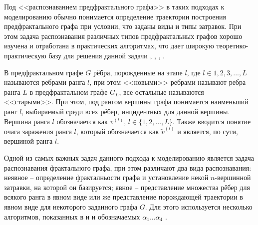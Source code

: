 Под <<распознаванием предфрактального графа>> в таких подходах к моделированию  обычно понимается  определение траектории построения предфрактального графа при условии, что заданы виды и типы затравок. При этом задача распознавания различных типов предфрактальных графов хорошо изучена и отработана в практических алгоритмах, что дает широкую теоретико-практическую базу для решения данной задачи %
\cite{Reznikov:2010},
\cite{Naimanova:2007},
\cite{Utukaeva:2008},
\cite{Utukaeva:2011}
.

В предфрактальном графе $G$ рёбра, порожденные на этапе $l$, где $l \in {1,2,3, ..., L}$ называются ребрами ранга $l$, при этом <<новыми>> ребрами называют ребра ранга $L$ в предфрактальном графе $G_L$, все остальные называются <<старыми>>.  При этом, под рангом вершины графа понимается наименьший ранг $l$, выбираемый среди всех рёбер, инцидентных для данной вершины. Вершина ранга $l$ обозначается как $v^{(l)}$, $l \in \{1,2,..., L\}$. Также вводится понятие очага заражения ранга $l$, который обозначается как $\tilde{v}^{(l)}$ и является, по сути, вершиной ранга $l$. 

Одной из самых важных задач данного подхода к моделированию является задача распознавания фрактального графа, при этом различают два вида распознавания: неявное -- определение фракталньости графа и установление некой $n$-вершинной затравки, на которой он базируется; явное -- представление множества рёбер для всякого ранга в явном виде или же представление порождающей траектории в явном виде для некоторого заданного графа $G$. Для этого используется несколько алгоритмов, показанных в  %
\cite{Utakaeva_disser:2011} и 
и \cite{Reznikov:2010} обозначаемых $\alpha_1 ... \alpha_4$ %
\cite{Reznikov_disser:2013}.

